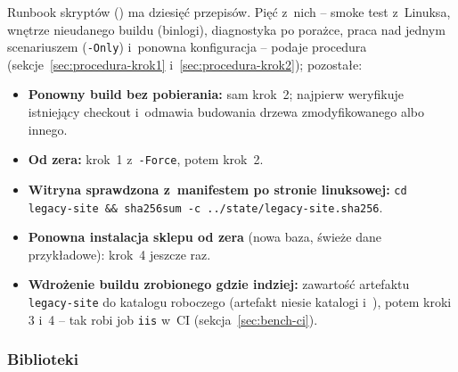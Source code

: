 Runbook skryptów () ma dziesięć przepisów. Pięć z~nich -- smoke
test z~Linuksa, wnętrze nieudanego buildu (binlogi), diagnostyka po porażce, praca nad
jednym scenariuszem (\texttt{-Only}) i~ponowna konfiguracja -- podaje procedura
(sekcje~\ref{sec:procedura-krok1} i~\ref{sec:procedura-krok2}); pozostałe:

\begin{itemize}
  \item \textbf{Ponowny build bez pobierania:} sam krok~2; najpierw weryfikuje istniejący
    checkout i~odmawia budowania drzewa zmodyfikowanego albo innego.
  \item \textbf{Od zera:} krok~1 z~\texttt{-Force}, potem krok~2.
  \item \textbf{Witryna sprawdzona z~manifestem po stronie linuksowej:}
    \texttt{cd legacy-site \&\& sha256sum -c ../state/legacy-site.sha256}.
  \item \textbf{Ponowna instalacja sklepu od zera} (nowa baza, świeże dane przykładowe):
    krok~4 jeszcze raz.
  \item \textbf{Wdrożenie buildu zrobionego gdzie indziej:} zawartość artefaktu
    \texttt{legacy-site} do katalogu roboczego (artefakt niesie katalogi 
    i~), potem kroki 3 i~4 -- tak robi job \texttt{iis} w~CI
    (sekcja~\ref{sec:bench-ci}).
\end{itemize}


\subsubsection{Biblioteki}\label{sec:bench-biblioteki}

